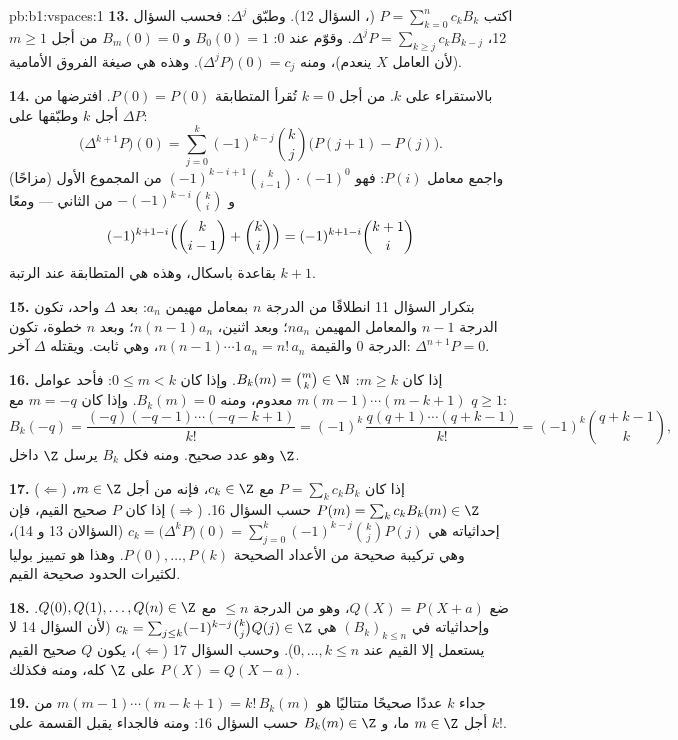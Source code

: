 \begin{solution}{pb:b1:vspaces:1}
\textbf{13.} اكتب $P = \sum_{k=0}^{n} c_k B_k$ (، السؤال
12). وطبّق $\Delta^{j}$: فحسب السؤال 12، $\Delta^{j} P = \sum_{k
\geq j} c_k B_{k-j}$. وقوّم عند $0$: $B_0(0) = 1$ و $B_m(0) =
0$ من أجل $m \geq 1$ (لأن العامل $X$ ينعدم)، ومنه
$\bigl(\Delta^{j}P\bigr)(0) = c_j$. وهذه هي صيغة الفروق
الأمامية.

\textbf{14.} بالاستقراء على $k$. من أجل $k = 0$ تُقرأ المتطابقة
$P(0) = P(0)$. افترضها من أجل $k$ وطبّقها على $\Delta P$:
\[
\bigl(\Delta^{k+1} P\bigr)(0)
= \sum_{j=0}^{k} (-1)^{k-j}\binom kj \bigl(P(j+1) - P(j)\bigr).
\]
واجمع معامل $P(i)$: فهو $(-1)^{k-i+1}\binom
k{i-1}\cdot(-1)^{0}$ من المجموع الأول (مزاحًا) و
$-(-1)^{k-i}\binom ki$ من الثاني --- ومعًا
\[
(-1)^{k+1-i}\Bigl(\binom k{i-1} + \binom ki\Bigr)
= (-1)^{k+1-i}\binom{k+1}i
\]
بقاعدة باسكال، وهذه هي المتطابقة عند الرتبة $k + 1$.

\textbf{15.} بتكرار السؤال 11 انطلاقًا من الدرجة $n$ بمعامل
مهيمن $a_n$: بعد $\Delta$ واحد، تكون الدرجة $n-1$ والمعامل
المهيمن $n a_n$؛ وبعد اثنين، $n(n-1)a_n$؛ وبعد $n$ خطوة،
تكون الدرجة $0$ والقيمة $n(n-1)\cdots 1\, a_n = n!\,a_n$، وهي ثابت.
ويقتله $\Delta$ آخر: $\Delta^{n+1}P = 0$.

\textbf{16.} إذا كان $m \geq k$: $B_k(m) = \binom mk \in \N$. وإذا كان $0
\leq m < k$: فأحد عوامل $m(m-1)\cdots(m-k+1)$ معدوم، ومنه
$B_k(m) = 0$. وإذا كان $m = -q$ مع $q \geq 1$:
\[
B_k(-q) = \frac{(-q)(-q-1)\cdots(-q-k+1)}{k!}
= (-1)^k\,\frac{q(q+1)\cdots(q+k-1)}{k!}
= (-1)^k \binom{q+k-1}{k},
\]
وهو عدد صحيح. ومنه فكل $B_k$ يرسل $\Z$ داخل $\Z$.

\textbf{17.} ($\Leftarrow$) إذا كان $P = \sum_k c_k B_k$ مع $c_k \in
\Z$، فإنه من أجل $m \in \Z$، $P(m) = \sum_k c_k B_k(m) \in \Z$ حسب
السؤال 16. ($\Rightarrow$) إذا كان $P$ صحيح القيم، فإن
إحداثياته هي $c_k = \bigl(\Delta^k P\bigr)(0) = \sum_{j=0}^k
(-1)^{k-j}\binom kj P(j)$ (السؤالان 13 و 14)، وهي تركيبة
صحيحة من الأعداد الصحيحة $P(0), \dots, P(k)$. وهذا هو
تمييز بوليا لكثيرات الحدود صحيحة القيم.

\textbf{18.} ضع $Q(X) = P(X + a)$، وهو  من الدرجة $\leq
n$ مع $Q(0), Q(1), \dots, Q(n) \in \Z$. وإحداثياته في
$(B_k)_{k \leq n}$ هي $c_k = \sum_{j \leq k}(-1)^{k-j}\binom kj
Q(j) \in \Z$ (لأن السؤال 14 لا يستعمل إلا القيم عند $0, \dots, k
\leq n$). وحسب السؤال 17 ($\Leftarrow$)، يكون $Q$ صحيح القيم على
$\Z$ كله، ومنه فكذلك $P(X) = Q(X - a)$.

\textbf{19.} جداء $k$ عددًا صحيحًا متتاليًا هو $m(m-1)
\cdots(m-k+1) = k!\,B_k(m)$ من أجل $m \in \Z$ ما، و $B_k(m) \in
\Z$ حسب السؤال 16: ومنه فالجداء يقبل القسمة على $k!$.


\end{solution}

